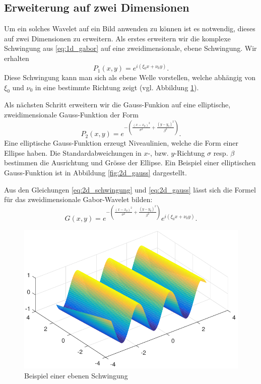 \subsection{Erweiterung auf zwei Dimensionen}\label{subsec:2D}

Um ein solches Wavelet auf ein Bild anwenden zu können ist es notwendig, dieses auf zwei Dimensionen zu erweitern.
Als erstes erweitern wir die komplexe Schwingung aus \ref{eq:1d_gabor} auf eine zweidimensionale, ebene Schwingung.
Wir erhalten
\begin{equation}\label{eq:2d_schwingung}
P_1(x,y)= e^{i(\xi_{0}x+\nu_{0}y)}.
\end{equation}
Diese Schwingung kann man sich als ebene Welle vorstellen, welche abhängig von $\xi_0$ und $\nu_0$ in eine bestimmte Richtung zeigt (vgl. Abbildung \ref{fig:planarwave}).

Als nächsten Schritt erweitern wir die Gauss-Funkion auf eine elliptische, zweidimensionale Gauss-Funktion der Form
\begin{equation}\label{eq:2d_gauss}
P_2(x,y)=e^{-(\frac{(x-x_{0})^{2}}{\sigma^{2}}+\frac{(y-y_{0})^{2}}{\beta^{2}})}.
\end{equation}
Eine elliptische Gauss-Funktion erzeugt Niveaulinien, welche die Form einer Ellipse haben.
Die Standardabweichungen in $x$-, bzw. $y$-Richtung $\sigma$ resp. $\beta$ bestimmen die Ausrichtung und Grösse der Ellipse.
Ein Beispiel einer elliptischen Gauss-Funktion ist in Abbildung \ref{fig:2d_gauss} dargestellt.

Aus den Gleichungen \ref{eq:2d_schwingung} und \ref{eq:2d_gauss} lässt sich die Formel für das zweidimensionale Gabor-Wavelet bilden:
\begin{equation}\label{eq:2dgabor1}
G(x,y)= e^{-(\frac{(x-x_{0})^{2}}{\sigma^{2}}+\frac{(y-y_{0})^{2}}{\beta^{2}})}
e^{i(\xi_{0}x+\nu_{0}y)}.
\end{equation}

\begin{figure}
	\centering
	\includegraphics[width=0.7\linewidth]{./papers/visuell/images/planarwave.pdf}
	\caption{Beispiel einer ebenen Schwingung}
	\label{fig:planarwave}
\end{figure}

